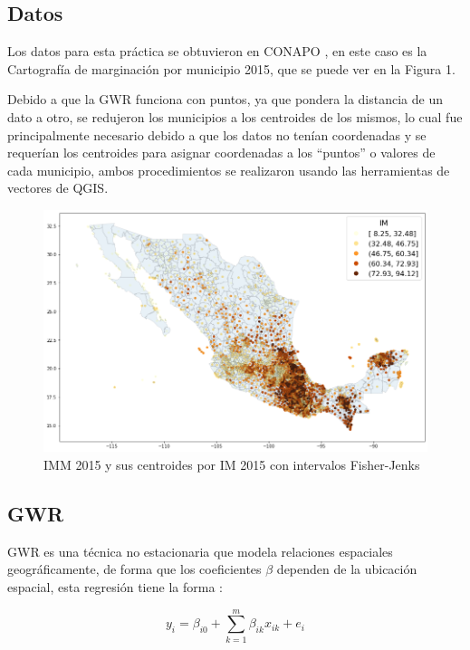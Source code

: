 \documentclass[12pt,letterpaper]{article}
\begin{document}
\subsection{Datos}

Los datos para esta práctica se obtuvieron en CONAPO \cite{a}, en este caso es la Cartografía de marginación por municipio 2015, que se puede ver en la Figura 1.

Debido a que la GWR funciona con puntos, ya que pondera la distancia de un dato a otro, se redujeron los municipios a los centroides de los mismos, lo cual fue principalmente necesario debido a que los datos no tenían coordenadas y se requerían los centroides para asignar coordenadas a los “puntos” o valores de cada municipio, ambos procedimientos se realizaron usando las herramientas de vectores de QGIS. 

\begin{figure}[H]
	\centering
	\includegraphics[scale=0.5]{output_6_1.png}
	\caption{IMM 2015 y sus centroides por IM 2015 con intervalos Fisher-Jenks}
\end{figure}

\subsection{GWR}

GWR es una técnica no estacionaria que modela relaciones espaciales geográficamente, de forma que los coeficientes $\beta$ dependen de la ubicación espacial, esta regresión tiene la forma \cite{b}: 

\begin{equation*}
	y_i = \beta_{i0} + \sum_{k=1}^{m} \beta_{ik} x_{ik} + e_i
\end{equation*}
\end{document}
